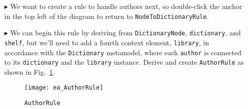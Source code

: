 \begin{itemize}
You can see that for every \texttt{entryNode}, \texttt{contentNode} and \texttt{indexNode} child elements are also created. When transforming from a tree to
dictionary, these are identified by their 0 and 1 indices. As such, the rule's first two constraints are used to ensure that this information is not
lost, guaranteeing their correct positions in the tree when transforming back.

\vspace{0.5cm}

The final constraint however, is one we haven't used before. If you re-examine your source \texttt{tree.xmi} model, you'll notice that every entry has a
different \texttt{index} value. This prevented us from setting an attribute constraint on \texttt{entryNode} but, as long as its index wasn't 0 indicating a
\texttt{titleNode} (as constrained in the previous \texttt{NodeToDictionaryRule}), it didn't matter. Unfortunately, this missing information means any new
\texttt{entryNode}s created in the backward transformation have a default 0 index value, and \emph{could} be mistaken by the rule. By using
\texttt{setDefaultNumber}, we have declared that any created default \texttt{index} attributes must be set to 2.

\subsubsection{AuthorRule} %

\item[$\blacktriangleright$] We want to create a rule to handle authors next, so double-click the anchor in the top left of the diagram to return to
\texttt{NodeToDictionaryRule}.

\item[$\blacktriangleright$] We can begin this rule by deriving from \texttt{DictionaryNode}, \texttt{dictionary}, and \texttt{shelf}, but we'll need to add a
fourth context element, \texttt{library}, in accordance with the \texttt{Dictionary} metamodel, where each \texttt{author} is connected to its \texttt{dictionary} and
the \texttt{library} instance. Derive and create \texttt{AuthorRule} as shown in Fig.~\ref{ea:AuthorRule}.

\vspace{0.5cm}

\begin{figure}[h]
  \hspace{-0.5cm}
  \texttt{[image: ea\_AuthorRule]}
  \caption{\texttt{AuthorRule}}
  \label{ea:AuthorRule}
\end{figure}

\end{itemize}

